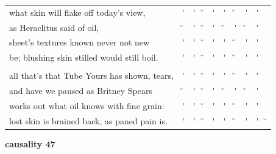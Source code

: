 \documentclass[12pt, landscape]{article}
\begin{document}
\begin{center}
\begin{tabularx}{\textwidth}{
>{\lefting\arraybackslash}X
c
c
c
c
c
c
c
c
c
}

what skin will flake off today's view, & \'{} & \'{} & \u{} & \'{} & \'{} & \u{} & \'{} & \'{} & \\
as Heraclitus said of oil, & \u{} & \'{} & \u{} & \'{} & \u{} & \'{} & \u{} & \'{} & \\
sheet's textures known never not new & \'{} & \'{} & \u{} & \'{} & \'{} & \u{} & \'{} & \'{} & \\
be; blushing skin stilled would still boil. & \'{} & \'{} & \u{} & \'{} & \'{} & \u{} & \'{} & \'{} & \\
 & & & & & & & & \\
all that's that Tube Yours has shown, tears,  & \'{} & \'{} & \u{} & \'{} & \'{} & \u{} & \'{} & \'{} & \\
and have we paused as Britney Spears & \u{} & \'{} & \u{} & \'{} & \u{} & \'{} & \u{} & \'{} & \\
works out what oil knows with fine grain: & \'{} & \'{} & \u{} & \'{} & \'{} & \u{} & \'{} & \'{} & \\
lost skin is brained back, as paned pain is. & \'{} & \'{} & \u{} & \'{} & \'{} & \u{} & \'{} & \'{} & \u{} \\
\end{tabularx}
\end{center}

\vspace*{\fill}

\newpage

\vspace*{\fill}

\noindent \textbf{causality 47}
\noindent \hfill \par
\end{document}
